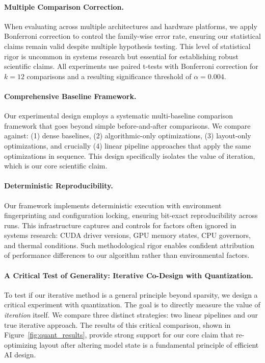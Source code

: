 \documentclass{article}
\begin{document}
\paragraph{Multiple Comparison Correction.}
When evaluating across multiple architectures and hardware platforms, we apply Bonferroni correction to control the family-wise error rate, ensuring our statistical claims remain valid despite multiple hypothesis testing. This level of statistical rigor is uncommon in systems research but essential for establishing robust scientific claims.
All experiments use paired t-tests with Bonferroni correction for $k=12$ comparisons and a resulting significance threshold of $\alpha=0.004$.

\paragraph{Comprehensive Baseline Framework.}
Our experimental design employs a systematic multi-baseline comparison framework that goes beyond simple before-and-after comparisons. We compare against: (1) dense baselines, (2) algorithmic-only optimizations, (3) layout-only optimizations, and crucially (4) linear pipeline approaches that apply the same optimizations in sequence. This design specifically isolates the value of iteration, which is our core scientific claim.

\paragraph{Deterministic Reproducibility.}
Our framework implements deterministic execution with environment fingerprinting and configuration locking, ensuring bit-exact reproducibility across runs. This infrastructure captures and controls for factors often ignored in systems research: CUDA driver versions, GPU memory states, CPU governors, and thermal conditions. Such methodological rigor enables confident attribution of performance differences to our algorithm rather than environmental factors.

\paragraph{A Critical Test of Generality: Iterative Co-Design with Quantization.}
To test if our iterative method is a general principle beyond sparsity, we design a critical experiment with quantization. The goal is to directly measure the value of \textit{iteration} itself. We compare three distinct strategies: two linear pipelines and our true iterative approach. The results of this critical comparison, shown in Figure~\ref{fig:quant_results}, provide strong support for our core claim that re-optimizing layout after altering model state is a fundamental principle of efficient AI design.
\end{document}
